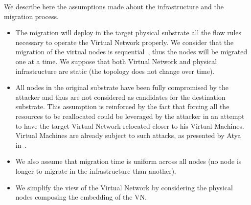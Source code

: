 \label{sec:mdp-system-hypotheses}
We describe here the assumptions made about the infrastructure and the migration process.

\begin{itemize}
    \item
    The migration will deploy in the target physical substrate all the flow rules necessary to operate the Virtual Network properly. We consider that the migration of the virtual nodes is sequential~\cite{Lime-Ghorbani2014}, thus the nodes will be migrated one at a time.
    We suppose that both Virtual Network and physical infrastructure are static (\ie the topology does not change over time).
    
    \item All nodes in the original substrate have been fully compromised by the attacker and thus are not considered as candidates for the destination substrate.  
    This assumption is reinforced by the fact that forcing all the resources to be reallocated could be leveraged by the attacker in an attempt to have the target Virtual Network relocated closer to his Virtual Machines.
    Virtual Machines are already subject to such attacks, as presented by Atya \etal in~\cite{stalling-atya2017,malicious-atya2017}.

    \item
    We also assume that migration time is uniform across all nodes (\ie no node is longer to migrate in the infrastructure than another).
    
    \item
     We simplify the view of the Virtual Network by considering the physical nodes composing the embedding of the VN.
\end{itemize}


